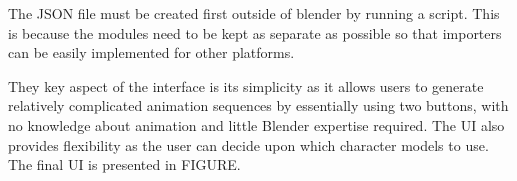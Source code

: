 The JSON file must be created first outside of blender by running a script. This is because the modules need to be kept as separate as possible so that importers can be easily implemented for other platforms.

They key aspect of the interface is its simplicity as it allows users to generate relatively complicated animation sequences by essentially using two buttons, with no knowledge about animation and little Blender expertise required. The UI also provides flexibility as the user can decide upon which character models to use. The final UI is presented in FIGURE.





